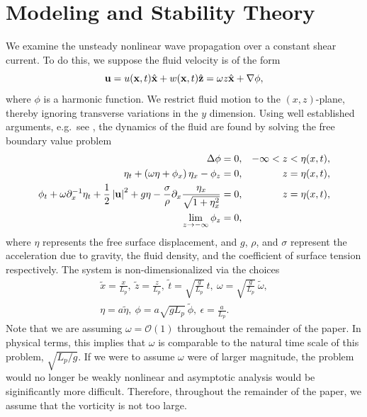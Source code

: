 \documentclass[a4paper,11pt]{article}
\newcommand{\pd}{\partial}
\begin{document}
\section{Modeling and Stability Theory}
We examine the unsteady nonlinear wave propagation over a constant shear current.  To do this, we suppose the fluid velocity is of the form
\[
{\bf u} = u({\bf x},t)\hat{{\bf x}} + w({\bf x},t)\hat{{\bf z}} = \omega z\hat{{\bf x}} + \nabla \phi,
\]
where $\phi$ is a harmonic function.  We restrict fluid motion to the $(x,z)$-plane, thereby ignoring transverse variations in the $y$ dimension.   Using well established arguments, e.g.~see \cite{ashton}, the dynamics of the fluid are found by solving the free boundary value problem
\begin{align}
\Delta \phi = 0, & & -\infty< z < \eta(x,t), \nonumber \\
\eta_{t} +\left(\omega\eta+\phi_{x}\right)\eta_{x} - \phi_{z} = 0, & & z=\eta(x,t), \label{kine}\\
\phi_{t} + \omega\pd_{x}^{-1}\eta_{t} + \frac{1}{2} \left|{\bf
    u}\right|^{2} + g\eta -
\frac{\sigma}{\rho}\pd_{x}\frac{\eta_{x}}{\sqrt{1+\eta_{x}^{2}}}= 0, &
& z=\eta(x,t), \label{bernou}\\
\lim_{z\rightarrow -\infty} \phi_{z} = 0, \nonumber
\end{align}
where $\eta$ represents the free surface displacement, and $g$, $\rho$, and $\sigma$ represent the acceleration due to gravity, the fluid density, and the coefficient of surface tension respectively.  The system is non-dimensionalized via the choices 
\begin{align*}
\tilde{x} = \frac{x}{L_{p}}, ~\tilde{z} = \frac{z}{L_{p}}, ~ \tilde{t} = \sqrt{\frac{g}{L_{p}}}~t, ~\omega = \sqrt{\frac{g}{L_{p}}}~\tilde{\omega}, \\
\eta = a \tilde{\eta}, ~ \phi  = a\sqrt{gL_{p}}~\tilde{\phi} , ~ \epsilon = \frac{a}{L_{p}}.
\end{align*}
Note that we are assuming $\omega = \mathcal{O}(1)$ throughout the remainder of the paper.  In physical terms, this implies that $\omega$ is comparable to the natural time scale of this problem, $\sqrt{L_{p}/g}$.  If we were to assume $\omega$ were of larger magnitude, the problem would no longer be weakly nonlinear and asymptotic analysis would be siginificantly more difficult.  Therefore, throughout the remainder of the paper, we assume that the vorticity is not too large.
\end{document}
